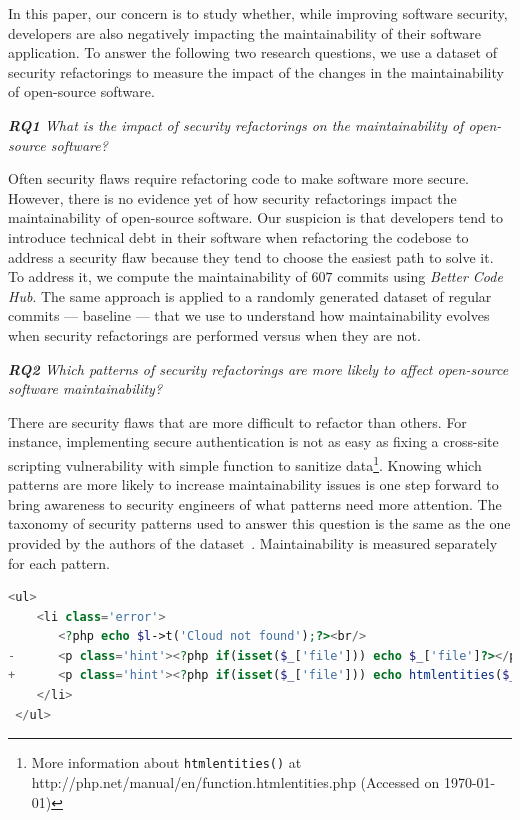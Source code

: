 \documentclass[10pt,conference]{IEEEtran}
\newcounter{lstannotation}
\begin{document}
In this paper, our concern is to study whether, while improving software
security, developers are also negatively impacting the maintainability
of their software application. To answer the following two
research questions, we use a dataset of security refactorings to measure the
impact of the changes in the maintainability of open-source software.

\begin{framed}
\textit{\textbf{RQ1} What is the impact of security refactorings on the
maintainability of open-source software?}
\end{framed}

Often security flaws require refactoring code to make software more secure.
However, there is no evidence yet of how security refactorings impact the
maintainability of open-source software. Our suspicion is that developers tend
to introduce technical debt in their software when refactoring the codebose to
address a security flaw because they tend to choose the easiest path to solve
it. To address it, we compute the maintainability of $607$ commits using
\emph{Better Code Hub}. The same approach is applied to a randomly generated
dataset of regular commits --- baseline --- that we use to understand how
maintainability evolves when security refactorings are performed versus when
they are not.

\begin{framed}
\textit{\textbf{RQ2} Which patterns of security refactorings are more likely to
affect open-source software maintainability?}
\end{framed}

There are security flaws that are more difficult to refactor than others. For
instance, implementing secure authentication is not as easy as fixing a cross-site scripting vulnerability with simple function to sanitize data\footnote{More information about \texttt{htmlentities()} at http://php.net/manual/en/function.htmlentities.php (Accessed on \today{})}. Knowing which patterns are more likely to increase maintainability
issues is one step forward to bring awareness to security engineers of what
patterns need more attention. The taxonomy of security patterns used to answer
this question is the same as the one provided by the authors of the dataset~\cite{Reis:2017:IJSSE}.
Maintainability is measured separately for each pattern.

\setcounter{lstannotation}{0}
\begin{lstlisting}[style={PHPStyle}, caption={Fix provided by \texttt{nextcloud/server} developers to a \\Cross-Site Scripting vulnerability},label={lst:fix},language=php]
 <ul>
    <li class='error'>
       <?php echo $l->t('Cloud not found');?><br/>
-      <p class='hint'><?php if(isset($_['file'])) echo $_['file']?></p>
+      <p class='hint'><?php if(isset($_['file'])) echo htmlentities($_['file'])?></p>
    </li>
 </ul>

\end{lstlisting}
%
\end{document}
